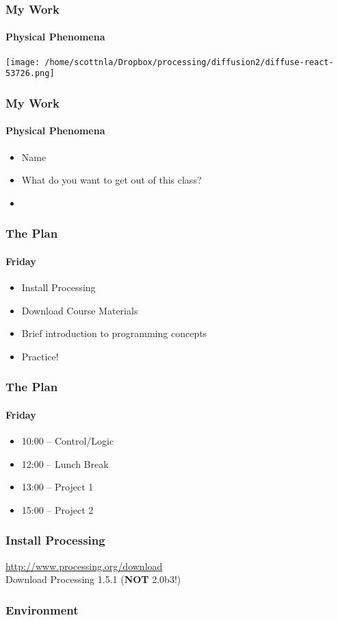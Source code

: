 \documentclass[xcolor=dvipsnames]{beamer}
\begin{document}
\begin{frame}
\frametitle{My Work}
\framesubtitle{Physical Phenomena}
\begin{center}
\texttt{[image: /home/scottnla/Dropbox/processing/diffusion2/diffuse-react-53726.png]}
\end{center}
\end{frame}

\begin{frame}
\frametitle{My Work}
\framesubtitle{Physical Phenomena}
\begin{itemize}
\item Name
\item What do you want to get out of this class?
\item 
\end{itemize}
\end{frame}

\begin{frame}
\frametitle{The Plan}
\framesubtitle{Friday}
\begin{itemize}
\item Install Processing
\item Download Course Materials
\item Brief introduction to programming concepts
\item Practice!
\end{itemize}
\end{frame}

\begin{frame}
\frametitle{The Plan}
\framesubtitle{Friday}
\begin{itemize}
\item 10:00 -- Control/Logic
\item 12:00 -- Lunch Break
\item 13:00 -- Project 1
\item 15:00 -- Project 2
\end{itemize}
\end{frame}

\begin{frame}
\frametitle{Install Processing}
\begin{center}
\url{http://www.processing.org/download} \\
Download Processing 1.5.1 (\textbf{NOT} 2.0b3!)
\end{center}
\end{frame}

\begin{frame}
\frametitle{Environment}
\end{frame}
\end{document}
